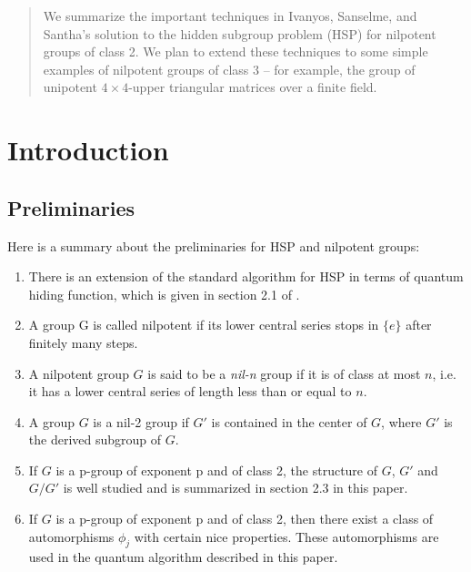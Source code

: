 \documentclass[conference]{IEEEtran}
\begin{document}




\maketitle

\begin{abstract}
We summarize the important techniques in Ivanyos, Sanselme, and Santha's solution  \cite{Ivanyos} to the hidden subgroup problem (HSP) for nilpotent groups of class 2.  We  plan to extend these techniques to some simple examples of nilpotent groups of class 3 -- for example,
the group of unipotent $4 \times 4$-upper triangular matrices over a finite field.
\end{abstract}



%
\IEEEpeerreviewmaketitle


\section{Introduction}
\subsection{Preliminaries}
Here is a summary about the preliminaries for HSP and nilpotent groups:

\begin{enumerate}
	\item There is an extension of the standard algorithm for HSP in terms of quantum hiding function, which is given in section 2.1 of \cite{Ivanyos}.
	\item A group G is called nilpotent if its lower central series stops in $ \{e\} $ after finitely many steps.
	\item A nilpotent group $ G $ is said to be a \emph{nil-n } group if it is of class at most $ n $, i.e. it has a lower central series of length less than or equal to $n$.
	\item A group $ G $ is a nil-2 group if $ G' $ is contained in the center of $ G $, where $ G' $ is the derived subgroup of $ G $.
	\item If $ G $ is a p-group of exponent p and of class 2, the structure of $ G $,  $ G' $ and $ G/G' $ is well studied and is summarized in section 2.3 in this paper.
	\item If $ G $ is a p-group of exponent p and of class 2, then there exist a class of automorphisms $ \phi_{j}$ with certain nice properties. These automorphisms are used in the quantum algorithm described in this paper. 
\end{enumerate}
\end{document}
